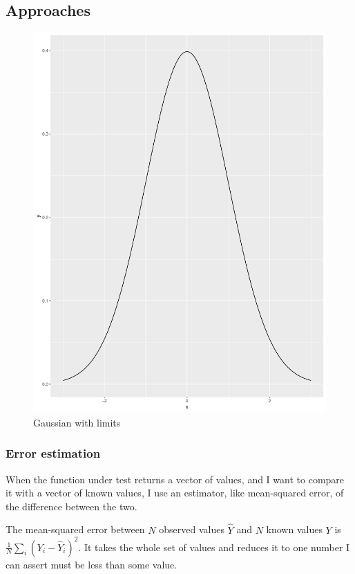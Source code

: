 \documentclass[fleqn,10pt]{olplainarticle}
\begin{document}
\subsection{Approaches}
\begin{figure}
    \centering
    \includegraphics[scale=0.25]{gaussianlimits.pdf}
    \caption{Gaussian with limits}
    \label{fig:gaussian-limits}
\end{figure}
\subsubsection{Error estimation}
When the function under test returns a vector of values,
and I want to compare it with a vector of known values,
I use an estimator, like mean-squared error, of the difference
between the two.

The mean-squared error between $N$ observed values $\hat{Y}$ and $N$ known values $Y$ is $\frac{1}{N}\sum_i (Y_i - \hat{Y}_i)^2$.
It takes the whole set of values and reduces it to one number I can assert must be less than some value.
\end{document}

